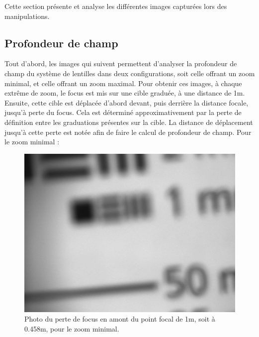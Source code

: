 \documentclass[11pt,letterpaper]{article}
\begin{document}
Cette section présente et analyse les différentes images capturées lors des
manipulations.

\subsection{Profondeur de champ}

Tout d'abord, les images qui suivent permettent d'analyser la profondeur de champ
du système de lentilles dans deux configurations, soit celle offrant un zoom minimal,
et celle offrant un zoom maximal. Pour obtenir ces images, à chaque extrême de zoom,
le focus est mis sur une cible graduée, à une distance de 1m. Ensuite, cette cible est
déplacée d'abord devant, puis derrière la distance focale, jusqu'à perte du focus.
Cela est déterminé approximativement par la perte de définition entre les graduations
présentes sur la cible. La distance de déplacement jusqu'à cette perte est notée afin
de faire le calcul de profondeur de champ. Pour le zoom minimal :

\begin{figure}[H]
  \centering
  \includegraphics[scale=0.3]{prof_0.458m_min.png}
  \caption{Photo du perte de focus en amont du point focal de 1m, soit à 0.458m,
  pour le zoom minimal.}
  \label{prof_avant_min}
\end{figure}
\end{document}
